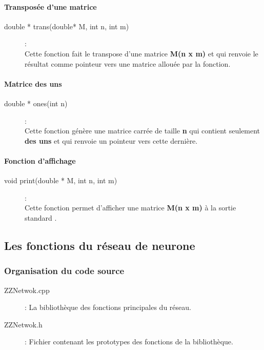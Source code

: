 \paragraph{Transposée d'une matrice}
\begin{description}
\item[{double * trans(double* M, int n, int m)}] :\\ Cette fonction fait le transpose d'une matrice \textbf{M(n x m)} et qui renvoie le résultat comme pointeur vers une matrice allouée par la fonction.
\end{description}

\paragraph{Matrice des uns}
\begin{description}
\item[{double * ones(int n)}] :\\ Cette fonction génère une matrice carrée de taille \textbf{n} qui contient seulement \textbf{des uns} et qui renvoie un pointeur vers cette dernière.
\end{description}

\paragraph{Fonction d'affichage}
\begin{description}
\item[{void print(double * M, int n, int m)}] :\\ Cette fonction permet d'afficher une matrice \textbf{M(n x m)} à la sortie standard .
\end{description}

\subsection{Les fonctions du réseau de neurone}

\subsubsection{Organisation du code source}

\begin{description}
\item[ZZNetwok.cpp] : La bibliothèque des fonctions principales du réseau.
\item[ZZNetwok.h] : Fichier contenant les prototypes des fonctions de la bibliothèque.
\end{description}
